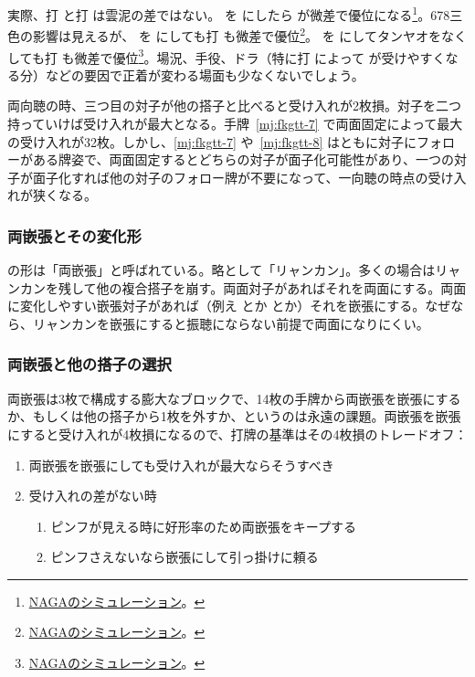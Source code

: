 \documentclass[../nankiru_main.tex]{subfiles}
\begin{document}
実際、打  と打  は雲泥の差ではない。 を  にしたら  が微差で優位になる\footnote{\href{https://naga.dmv.nico/htmls/f8114d37f9c2591bdcde7cd17f6e976382b87313a37559566655fcf716f5e5dcv2_2.html?tw=0}{NAGAのシミュレーション}。}。678三色の影響は見えるが、 を  にしても打  も微差で優位\footnote{\href{https://naga.dmv.nico/htmls/8ac1bd49c7dded3d85cbf09c7707798d0af74b12c2fd23081536b715ae417024v2_2.html?tw=0}{NAGAのシミュレーション}。}。 を  にしてタンヤオをなくしても打  も微差で優位\footnote{\href{https://naga.dmv.nico/htmls/4a6197f1dc4baa529496bd67689cf1267a568061adc416affedd88b1d8e94889v2_2.html?tw=0}{NAGAのシミュレーション}。}。場況、手役、ドラ（特に打  によって  が受けやすくなる分）などの要因で正着が変わる場面も少なくないでしょう。

両向聴の時、三つ目の対子が他の搭子と比べると受け入れが2枚損。対子を二つ持っていけば受け入れが最大となる。手牌~\ref{mj:fkgtt-7} で両面固定によって最大の受け入れが32枚。しかし、\ref{mj:fkgtt-7} や~\ref{mj:fkgtt-8} はともに対子にフォローがある牌姿で、両面固定するとどちらの対子が面子化可能性があり、一つの対子が面子化すれば他の対子のフォロー牌が不要になって、一向聴の時点の受け入れが狭くなる。


\subsubsection{両嵌張とその変化形}

 の形は「両嵌張」と呼ばれている。略として「リャンカン」。多くの場合はリャンカンを残して他の複合搭子を崩す。両面対子があればそれを両面にする。両面に変化しやすい嵌張対子があれば（例え  とか  とか）それを嵌張にする。なぜなら、リャンカンを嵌張にすると振聴にならない前提で両面になりにくい\citep[][p. 82]{uzaku-haikouritsu}。


\subsubsection*{両嵌張と他の搭子の選択}

両嵌張は3枚で構成する膨大なブロックで、14枚の手牌から両嵌張を嵌張にするか、もしくは他の搭子から1枚を外すか、というのは永遠の課題。両嵌張を嵌張にすると受け入れが4枚損になるので、打牌の基準はその4枚損のトレードオフ：

\begin{enumerate}
  \item 両嵌張を嵌張にしても受け入れが最大ならそうすべき
  \item 受け入れの差がない時
  \begin{enumerate}
    \item ピンフが見える時に好形率のため両嵌張をキープする
    \item ピンフさえないなら嵌張にして引っ掛けに頼る
  \end{enumerate}
\end{enumerate}
\end{document}
